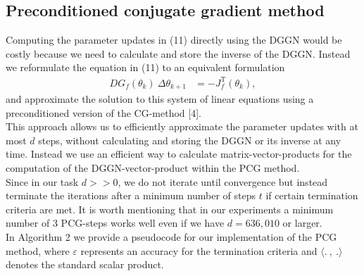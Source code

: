 \documentclass[conference]{IEEEtran}
\begin{document}
	\subsection{Preconditioned conjugate gradient method}
	\noindent
	Computing the parameter updates in (11) directly using the DGGN would be costly because we need to calculate and store the inverse of the DGGN. Instead we reformulate the equation in (11) to an equivalent formulation
	\begin{align}
	DG_{f}(\theta_{k})\: \Delta\theta_{k+1} &= -J_{f}^{\mathrm{T}}(\theta_{k}),
	\end{align}
	and approximate the solution to this system of linear equations using a preconditioned version of the CG-method [4]. \\
	This approach allows us to efficiently approximate the parameter updates with at most $d$ steps, without calculating and storing the DGGN or its inverse at any time. Instead we use an efficient way to calculate matrix-vector-products for the computation of the DGGN-vector-product within the PCG method.\\
	Since in our task $d>>0$, we do not iterate until convergence but instead terminate the iterations after a minimum number of steps $t$ if certain termination criteria are met. It is worth mentioning that in our experiments a minimum number of 3 PCG-steps works well even if we have $d=636,010$ or larger. \\
	In Algorithm 2 we provide a pseudocode for our implementation of the PCG method, where $\varepsilon$ represents an accuracy for the termination criteria and $\langle .\:,\: .\rangle$ denotes the standard scalar product.
\end{document}
